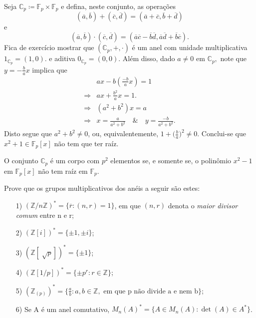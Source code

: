 \documentclass[AlgebraII/algebraII_notes.tex]{subfiles}
\begin{document}
Seja \(\mathbb{C}_{p}\coloneqq \mathbb{F}_{p}\times \mathbb{F}_{p}\) e defina, neste conjunto, as operações
\[
	(\overline{a}, \overline{b}) + (\overline{c}, \overline{d}) = (\overline{a}+\overline{c}, \overline{b}+\overline{d})
\]
e
\[
	(\overline{a}, \overline{b})\cdot (\overline{c}, \overline{d}) = (\overline{a}\overline{c} - \overline{b}\overline{d}, \overline{a}\overline{d}+\overline{b}\overline{c}).
\]
Fica de exercício mostrar que \((\mathbb{C}_{p}, +, \cdot )\) é um anel com unidade multiplicativa \(1_{\mathbb{C}_{p}} = (1, 0).\) e aditiva \(0_{\mathbb{C}_{p}} = (0, 0).\)
Além disso, dado \(a\neq 0\) em \(\mathbb{C}_{p},\) note que \(y = -\frac{b}{a}x\) implica que
\begin{align*}
	            & ax - b(\frac{-b}{a}x) = 1                                          \\
	\Rightarrow & ax + \frac{b^{2}}{a}x = 1.                                         \\
	\Rightarrow & (a^{2} + b^{2})x = a                                               \\
	\Rightarrow & x = \frac{a}{a^{2}+b^{2}} \quad\&\quad y = \frac{-b}{a^{2}+b^{2}}.
\end{align*}
Disto segue que \(a^{2} + b^{2}\neq 0\), ou, equivalentemente, \(1 + \biggl(\frac{b}{a}\biggr)^{2}\neq 0\). Conclui-se que \(x^{2}+1\in \mathbb{F}_{p}[x]\) não tem que ter raíz.
\begin{prop*}
	O conjunto \(\mathbb{C}_{p}\) é um corpo com \(p^{2}\) elementos se, e somente se, o polinômio \(x^{2}-1 \) em \(\mathbb{F}_{p}[x]\) não tem raíz em \(\mathbb{F}_{p}.\)
\end{prop*}
\begin{example}[Exercício]
	Prove que os grupos multiplicativos dos anéis a seguir são estes:
	\begin{itemize}
		\item[1)] \((\mathbb{Z}/n \mathbb{Z})^{*} = \{\overline{r}: (n, r) = 1\}\), em que \((n, r)\) denota o \textit{maior divisor comum} entre n e r;
		\item[2)] \((\mathbb{Z}[i])^{*}=\{\pm1, \pm i\}\);
		\item[3)] \((\mathbb{Z}[\sqrt[]{p}])^{*} = \{\pm1\}\);
		\item[4)] \((\mathbb{Z}[1/p])^{*} = \{\pm p^{r}: r\in \mathbb{Z}\}\);
		\item[5)] \((\mathbb{Z}_{(p)})^{*} = \biggl\{\frac{a}{b}: a, b\in \mathbb{Z}, \text{ em que p não divide a e nem b}\biggr\}\);
		\item[6)] Se A é um anel comutativo, \(M_{n}(A)^{*} = \{A\in M_{n}(A): \det{(A)}\in A^{*}\}\).
	\end{itemize}
\end{example}
\end{document}

